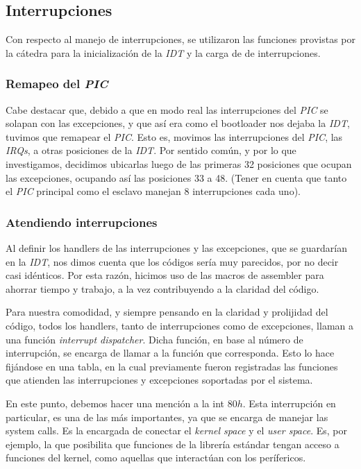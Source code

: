 \documentclass[a4paper,10pt]{article}
\begin{document}
    \subsection{Interrupciones}
        Con respecto al manejo de interrupciones, se utilizaron las funciones provistas por la cátedra para la inicialización de la \textit{IDT} y
        la carga de de interrupciones.

        \subsubsection{Remapeo del \textit{PIC}}
            Cabe destacar que, debido a que en modo real las interrupciones del \textit{PIC} se solapan con las excepciones, y que así era como el bootloader
            nos dejaba la \textit{IDT}, tuvimos que remapear el \textit{PIC}. Esto es, movimos las interrupciones del \textit{PIC}, las \textit{IRQs}, a otras posiciones de la \textit{IDT}. Por sentido común, y por lo que investigamos, decidimos
            ubicarlas luego de las primeras 32 posiciones que ocupan las excepciones, ocupando así las posiciones 33 a 48. (Tener en cuenta
            que tanto el \textit{PIC} principal como el esclavo manejan 8 interrupciones cada uno).
        
        \subsubsection{Atendiendo interrupciones}
            Al definir los handlers de las interrupciones y las excepciones, que se guardarían en la \textit{IDT}, nos dimos cuenta que los códigos sería muy parecidos,
            por no decir casi idénticos. Por esta razón, hicimos uso de las macros de assembler para ahorrar tiempo y trabajo, a la vez
            contribuyendo a la claridad del código.
            
            Para nuestra comodidad, y siempre pensando en la claridad y prolijidad del código, todos los handlers, tanto de interrupciones
            como de excepciones, llaman a una función \textit{interrupt dispatcher}. Dicha función, en base al número de interrupción, se encarga de llamar
	    a la función que corresponda. Esto lo hace fijándose en una tabla, en la cual previamente fueron registradas las funciones que atienden
	    las interrupciones y excepciones soportadas por el sistema.
	    
	    En este punto, debemos hacer una mención a la int $80h$. Esta interrupción en particular, es una de las más importantes, ya que se encarga de manejar las
	    system calls. Es la encargada de conectar el \textit{kernel space} y el \textit{user space}. Es, por ejemplo, la que posibilita que funciones de la librería
	    estándar tengan acceso a funciones del kernel, como aquellas que interactúan con los perífericos. 
	   
\end{document}

